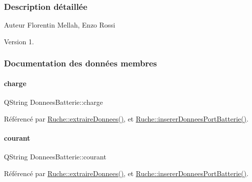 \subsubsection{Description détaillée}
\begin{DoxyAuthor}{Auteur}
Florentin Mellah, Enzo Rossi
\end{DoxyAuthor}
\begin{DoxyVersion}{Version}
1. 
\end{DoxyVersion}


\subsubsection{Documentation des données membres}
\mbox{\label{struct_donnees_batterie_a4d3cf76cf1722835a6449bc4a29e761b}} 
\paragraph{\texorpdfstring{charge}{charge}}
{\footnotesize\ttfamily Q\+String Donnees\+Batterie\+::charge}



Référencé par \hyperlink{class_ruche_a21c0dafeaec03d451590037343e6a3ca}{Ruche\+::extraire\+Donnees()}, et \hyperlink{class_ruche_a509367d6b2bcb7e6431fc1cc5ff606b5}{Ruche\+::inserer\+Donnees\+Port\+Batterie()}.

\mbox{\label{struct_donnees_batterie_a7a996ea5eacd6839a8a34dbbe48eb59a}} 
\paragraph{\texorpdfstring{courant}{courant}}
{\footnotesize\ttfamily Q\+String Donnees\+Batterie\+::courant}



Référencé par \hyperlink{class_ruche_a21c0dafeaec03d451590037343e6a3ca}{Ruche\+::extraire\+Donnees()}, et \hyperlink{class_ruche_a509367d6b2bcb7e6431fc1cc5ff606b5}{Ruche\+::inserer\+Donnees\+Port\+Batterie()}.

\mbox{\label{struct_donnees_batterie_a98859495d938a84f1c6aa818e0d31e82}} 
